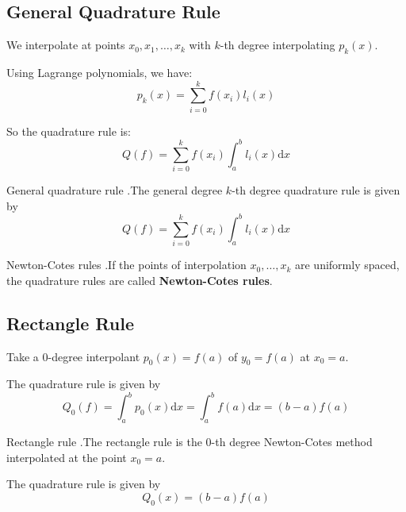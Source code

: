 \documentclass[12pt,letterpaper]{article}
\newcommand{\dd}{\mathrm{d}}
\begin{document}
\subsection{General Quadrature Rule}

We interpolate at points $x_0, x_1, \dots, x_k$ with $k$-th degree interpolating $p_k(x)$.

Using Lagrange polynomials, we have:
\begin{equation}
	p_k(x) = \sum_{i=0}^k f(x_i) l_i(x)
\end{equation}

So the quadrature rule is:
\begin{equation}
	Q(f) = \sum_{i=0}^k f(x_i) \int_a^b l_i(x) \dd x
\end{equation}

\begin{theo}{General quadrature rule}
.The general degree $k$-th degree quadrature rule is given by
\begin{equation}\label{eq:general_quad}
	Q(f) = \sum_{i=0}^k f(x_i) \int_a^b l_i(x) \dd x
\end{equation}
\label{thm:general_quad}
\end{theo}

\begin{defn}{Newton-Cotes rules}
.If the points of interpolation $x_0, \dots, x_k$ are uniformly spaced, the quadrature rules are called \textbf{Newton-Cotes rules}.
\label{def:Newton_Cotes}
\end{defn}

\subsection{Rectangle Rule}
Take a $0$-degree interpolant $p_0(x) = f(a)$ of $y_0 = f(a)$ at $x_0 = a$.

The quadrature rule is given by
\begin{equation}
	Q_0(f) = \int_a^b p_0(x) \dd x = \int_a^b f(a) \dd x = (b-a) f(a)
\end{equation}

\begin{defn}{Rectangle rule}
.The rectangle rule is the $0$-th degree Newton-Cotes method interpolated at the point $x_0=a$.

\medskip

The quadrature rule is given by
\begin{equation}
	Q_0(x) = (b-a)f(a)
\end{equation}
\label{defn:rect_rule}
\end{defn}
\end{document}

